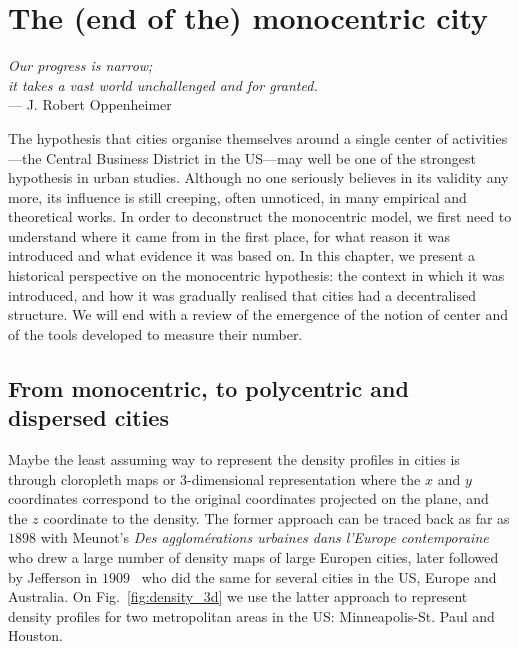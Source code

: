 %
\chapter{The (end of the) monocentric city}
\label{chap:monocentric_introduction}

\begin{flushright}{\slshape    
Our progress is narrow;\\
it takes a vast world unchallenged and for granted.}  \\ \medskip
--- J. Robert Oppenheimer~\cite{Oppenheimer:1954}
\end{flushright}


\bigskip


The hypothesis that cities organise themselves around a single center of
activities---the Central Business District in the US---may well be one of the
strongest hypothesis in urban studies. Although no one seriously believes in its
validity any more, its influence is still creeping, often unnoticed, in many
empirical and theoretical works.  In order to deconstruct the monocentric model,
we first need to understand where it came from in the first place, for what
reason it was introduced and what evidence it was based on. In this chapter, we
present a historical perspective on the monocentric hypothesis: the context in
which it was introduced, and how it was gradually realised that cities had a
decentralised structure. We will end with a review of the emergence of the
notion of center and of the tools developed to measure their number.

\section{From monocentric, to polycentric and dispersed cities}
\label{sec:introduction}

Maybe the least assuming way to represent the density profiles in cities is
through cloropleth maps or 3-dimensional representation where the $x$ and $y$
coordinates correspond to the original coordinates projected on the plane, and
the $z$ coordinate to the density. The former approach can be traced back as far
as $1898$ with Meunot's \emph{Des agglom\'erations urbaines dans l'Europe
contemporaine}~\cite{Meunot:1898} who drew a large number of density maps of
large Europen cities, later followed by Jefferson in
$1909$~\cite{Jefferson:1909} who did the same for several cities in the US,
Europe and Australia. On Fig.~\ref{fig:density_3d} we use the latter approach to
represent density profiles for two metropolitan areas in the US: Minneapolis-St.
Paul and Houston. \\


